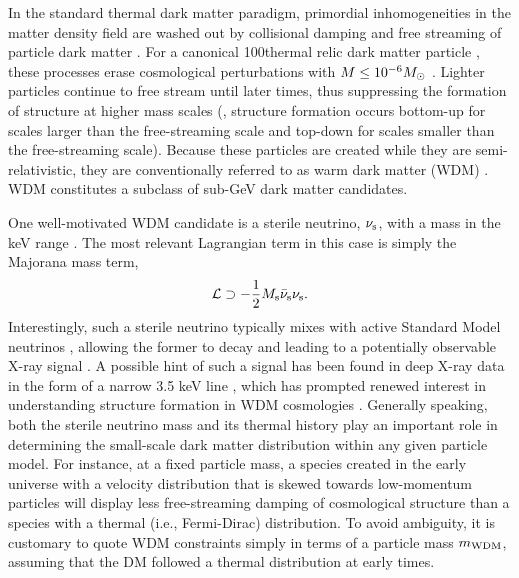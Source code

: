 In the standard thermal dark matter paradigm, primordial inhomogeneities in the matter density field are washed out by collisional damping and free streaming of particle dark matter \citep{Hofmann:2001,Green:2003un, Bertschinger:2006nq, Loeb:2005pm}.  
For a canonical 100\GeV thermal relic dark matter particle \citep[\eg, the WIMP;][]{steigman1985,Jungman:1995df}, these processes erase cosmological perturbations with $M \leq 10^{-6} M_\odot$ \citep[i.e., Earth mass;][]{Green:2003un, 2005Natur.433..389D}. 
Lighter particles continue to free stream until later times, thus suppressing the formation of structure at higher mass scales (\eg, structure formation occurs bottom-up for scales larger than the free-streaming scale and top-down for scales smaller than the free-streaming scale). Because these particles are created while they are semi-relativistic, they are conventionally referred to as warm dark matter (WDM) \citep{Bond:1983hb,Bode:2000gq,Dalcanton:2000hn}. 
WDM constitutes a subclass of sub-GeV dark matter candidates.

One well-motivated WDM candidate is a sterile neutrino, $\nu_{\rm s}$, with a mass in the keV range \citep[\eg][]{Abazajian:2017tcc,Adhikari:2017}. The most relevant Lagrangian term in this case is simply the Majorana mass term,
\begin{equation}
    \mathcal{L} \supset -\frac{1}{2}M_{\rm s}\bar{\nu}_{\rm s} \nu_{\rm s}.
\end{equation}
Interestingly, such a sterile neutrino typically mixes with active Standard Model neutrinos \citep[\eg,][]{Asaka:2005an}, allowing the former to decay and leading to a potentially observable X-ray signal \citep[\eg,][]{Abazajian:2001vt}. A possible hint of such a signal has been found in deep X-ray data in the form of a narrow 3.5 keV line \citep{Boyarsky:2014, Bulbul:2014, Boyarsky:2015, Iakubovskyi:2015}, which has prompted renewed interest in understanding structure formation in WDM cosmologies \citep[\eg,][]{Lovell:2013ola,Bose:2016irl,Bozek:2018ekc}. Generally speaking, both the sterile neutrino mass and its thermal history play an important role in determining the small-scale dark matter distribution within any given particle model. For instance, at a fixed particle mass, a species created in the early universe with a velocity distribution that is skewed towards low-momentum particles \citep[\eg,][]{Shi:1998km,Venumadhav:2015pla} will display less free-streaming damping of cosmological structure than a species with a thermal (i.e., Fermi-Dirac) distribution. To avoid ambiguity, it is customary to quote WDM constraints simply in terms of a particle mass $m_{\rm WDM}$, assuming that the DM followed a thermal distribution at early times.

